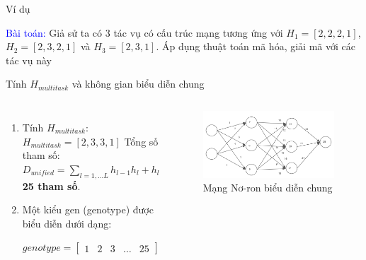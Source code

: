 	\begin{frame}{Ví dụ}
	    \begin{block}{}
	        \textcolor{blue}{Bài toán: } Giả sử ta có 3 tác vụ có cấu trúc mạng tương ứng với $H_1 = [2, 2, 2, 1]$, $H_2 = [2, 3, 2, 1]$ và $H_3 = [2, 3, 1]$. Áp dụng thuật toán mã hóa, giải mã với các tác vụ này
	    \end{block}
	    \begin{block}{Tính $H_{multitask}$ và không gian biểu diễn chung}
	        \begin{columns}
	        \begin{enumerate}
	            \setlength\itemsep{0.01em}
	            \item Tính $H_{multitask}$: $H_{multitask}=[2, 3, 3, 1]$ \Rightarrow Tổng số tham số: $D_{unified} = \sum_{l={1,...L}}h_{l-1}h_l + h_l$ \Rightarrow \textbf{25 tham số}.
	            \item Một kiểu gen (genotype) được biểu diễn dưới dạng:
	            \centerline{$
                  genotype=
                  \begin{bmatrix}
                    1& 2& 3& \dots & 25
                  \end{bmatrix}
                $}
	        \end{enumerate}
	        \begin{figure}[]
                    \centering
                    \includegraphics[width=1.0\linewidth]{images/neural-ex1.png}
                    \caption{Mạng Nơ-ron biểu diễn chung}
                    \label{fig:problem:neural-ex1}
            \end{figure}
	        \end{columns}
	    \end{block}
    \end{frame}
